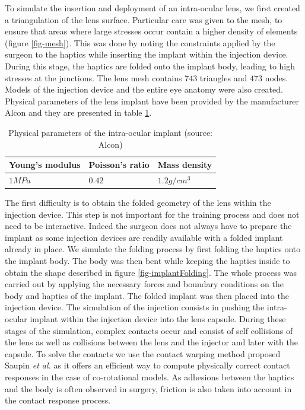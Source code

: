 \documentclass{llncs}
\begin{document}
To simulate the insertion and deployment of an intra-ocular lens, we first created a triangulation of the lens surface. Particular care was given to the mesh, to ensure that areas where large stresses occur contain a higher density of elements (figure \ref{fig-mesh}). This was done by noting the constraints applied by the surgeon to the haptics while inserting the implant within the injection device. During this stage, the haptics are folded onto the implant body, leading to high stresses at the junctions. The lens mesh contains $743$ triangles and $473$ nodes. Models of the injection device and the entire eye anatomy were also created. Physical parameters of the lens implant have been provided by the manufacturer Alcon and they are presented in table \ref{tab-parameters}.

\begin{table}[h!]
	\begin{center}
		\begin{tabular}{|p{3cm}|p{3cm}|p{3cm}|}
		\hline
		 \centering Young's modulus & \centering Poisson's ratio & \centering Mass density \tabularnewline
		\hline
		\centering $1 MPa$ & \centering $0.42$ & \centering $1.2 g/cm^3$ \tabularnewline
		\hline
		\end{tabular}
	\vspace{0.3cm}
	\caption{Physical parameters of the intra-ocular implant (source: Alcon)}
	\label{tab-parameters}
	\end{center}
\end{table}

The first difficulty is to obtain the folded geometry of the lens within the injection device. This step is not important for the training process and does not need to be interactive. Indeed the surgeon does not always have to prepare the implant as some injection devices are readily available with a folded implant already in place. We simulate the folding process by first folding the haptics onto the implant body. The body was then bent while keeping the haptics inside to obtain the shape described in figure \ref{fig-implantFolding}. The whole process was carried out by applying the necessary forces and boundary conditions on the body and haptics of the implant. The folded implant was then placed into the injection device. The simulation of the injection consists in pushing the intra-ocular implant within the injection device into the lens capsule. During these stages of the simulation, complex contacts occur and consist of self collisions of the lens as well as collisions between the lens and the injector and later with the capsule. To solve the contacts we use the contact warping method proposed Saupin \emph{et al.} \cite{Saupin08} as it offers an efficient way to compute physically correct contact responses in the case of co-rotational models. As adhesions between the haptics and the body is often observed in surgery, friction is also taken into account in the contact response process.
\end{document}
